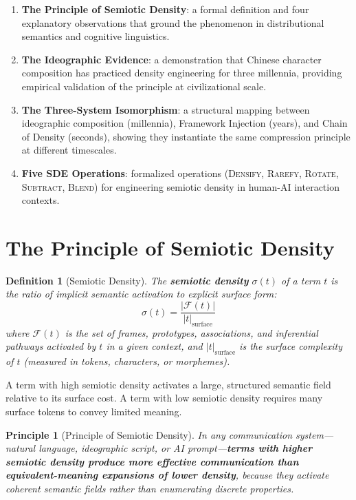 \documentclass[12pt,a4paper]{article}
\newtheorem{definition}{Definition}[section]
\newtheorem{principle}{Principle}[section]
\begin{document}
\begin{enumerate}
  \item \textbf{The Principle of Semiotic Density}: a formal definition and four explanatory observations that ground the phenomenon in distributional semantics and cognitive linguistics.
  \item \textbf{The Ideographic Evidence}: a demonstration that Chinese character composition has practiced density engineering for three millennia, providing empirical validation of the principle at civilizational scale.
  \item \textbf{The Three-System Isomorphism}: a structural mapping between ideographic composition (millennia), Framework Injection (years), and Chain of Density (seconds), showing they instantiate the same compression principle at different timescales.
  \item \textbf{Five SDE Operations}: formalized operations (\textsc{Densify}, \textsc{Rarefy}, \textsc{Rotate}, \textsc{Subtract}, \textsc{Blend}) for engineering semiotic density in human-AI interaction contexts.
\end{enumerate}


\section{The Principle of Semiotic Density}
\label{sec:principle}

\begin{definition}[Semiotic Density]
\label{def:semiotic-density}
The \textbf{semiotic density} $\sigma(t)$ of a term $t$ is the ratio of implicit semantic activation to explicit surface form:
\[
  \sigma(t) = \frac{|\mathcal{F}(t)|}{|t|_{\text{surface}}}
\]
where $\mathcal{F}(t)$ is the set of frames, prototypes, associations, and inferential pathways activated by $t$ in a given context, and $|t|_{\text{surface}}$ is the surface complexity of $t$ (measured in tokens, characters, or morphemes).
\end{definition}

A term with high semiotic density activates a large, structured semantic field relative to its surface cost.
A term with low semiotic density requires many surface tokens to convey limited meaning.

\begin{principle}[Principle of Semiotic Density]
\label{principle:psd}
In any communication system---natural language, ideographic script, or AI prompt---\textbf{terms with higher semiotic density produce more effective communication than equivalent-meaning expansions of lower density}, because they activate coherent semantic fields rather than enumerating discrete properties.
\end{principle}
\end{document}
